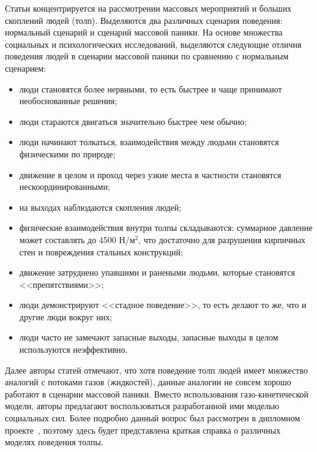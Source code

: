 Статьи концентрируется на рассмотрении массовых мероприятий и больших скоплений людей (толп).
Выделяются два различных сценария поведения: нормальный сценарий и сценарий массовой паники.
На основе множества социальных и психологических исследований, выделяются следующие отличия поведения людей в сценарии массовой паники по сравнению с нормальным сценарием:

\begin{itemize}
  \item люди становятся более нервными, то есть быстрее и чаще принимают необоснованные решения;
  \item люди стараются двигаться значительно быстрее чем обычно;
  \item люди начинают толкаться, взаимодействия между людьми становятся физическими по природе;
  \item движение в целом и проход через узкие места в частности становятся нескоординированными;
  \item на выходах наблюдаются скопления людей;
  \item физические взаимодействия внутри толпы складываются: суммарное давление может составлять до 4500 $\text{Н} / \text{м}^2$,
        что достаточно для разрушения кирпичных стен и повреждения стальных конструкций;
  \item движение затруднено упавшими и ранеными людьми, которые становятся <<препятствиями>>;
  \item люди демонстрируют <<стадное поведение>>, то есть делают то же, что и другие люди вокруг них;
  \item люди часто не замечают запасные выходы, запасные выходы в целом используются неэффективно.
\end{itemize}

Далее авторы статей отмечают, что хотя поведение толп людей имеет множество аналогий с потоками газов (жидкостей), данные аналогии не совсем хорошо работают в сценарии массовой паники.
Вместо использования газо-кинетической модели, авторы предлагают воспользоваться разработанной ими моделью социальных сил.
Более подробно данный вопрос был рассмотрен в дипломном проекте~\cite{my_diploma}, поэтому здесь будет представлена краткая справка о различных моделях поведения толпы.

